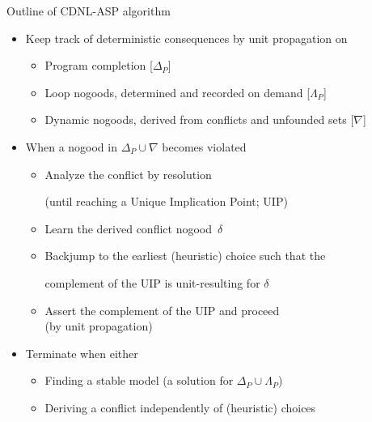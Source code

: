 \begin{frame}{Outline of CDNL-ASP algorithm}
\begin{itemize}
\item Keep track of deterministic consequences by unit propagation on
  \begin{itemize}
  \item Program completion \hfill [$\Delta_P$]%
  \item Loop nogoods, determined and recorded on demand \hfill [$\Lambda_P$]%
  \item Dynamic nogoods, derived from conflicts and unfounded sets \hfill[$\nabla$]%
  \end{itemize}
\pause
\item When a nogood in $\Delta_P\cup\nabla$ becomes \alert<2>{violated}
  \begin{itemize}
  \item \alert<2>{Analyze} the conflict by resolution
    \par
    (until reaching a {Unique Implication Point};  UIP)
  \item \alert<2>{Learn} the derived conflict nogood~$\delta$
  \item \alert<2>{Backjump} to the earliest (heuristic) choice such that
        the\par complement of the UIP is unit-resulting for $\delta$
  \item \alert<2>{Assert} the complement of the UIP and proceed\\
        (by unit propagation)
  \end{itemize}
\pause
\item Terminate when either
  \begin{itemize}
  \item Finding a stable model (a solution for $\Delta_P\cup\Lambda_P$)
  \item Deriving a conflict independently of (heuristic) choices
  \end{itemize}
\end{itemize}
\end{frame}
\begin{frame}[shrink=20]%

\end{frame}
